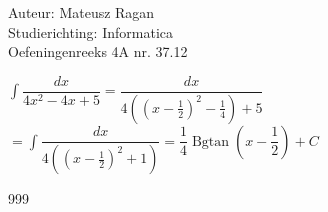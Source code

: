 \documentclass[a4paper]{article}
\begin{document}
\noindent \large Auteur: Mateusz Ragan \\
\noindent \large Studierichting: Informatica\\
\noindent \large Oefeningenreeks 4A nr. 37.12\\

\medskip

\normalsize

$\displaystyle\int \dfrac{dx}{4x^2 -4x+5} = \dfrac{dx}{4((x-\tfrac{1}{2})^2-\tfrac{1}{4}) +5}$ \\

$ = \displaystyle\int \dfrac{dx}{4((x-\tfrac{1}{2})^2+1)} = \dfrac{1}{4} \operatorname{Bgtan}\left(x-\dfrac{1}{2}\right) + C$

\begin{thebibliography}{999}
\end{thebibliography}
\end{document}

